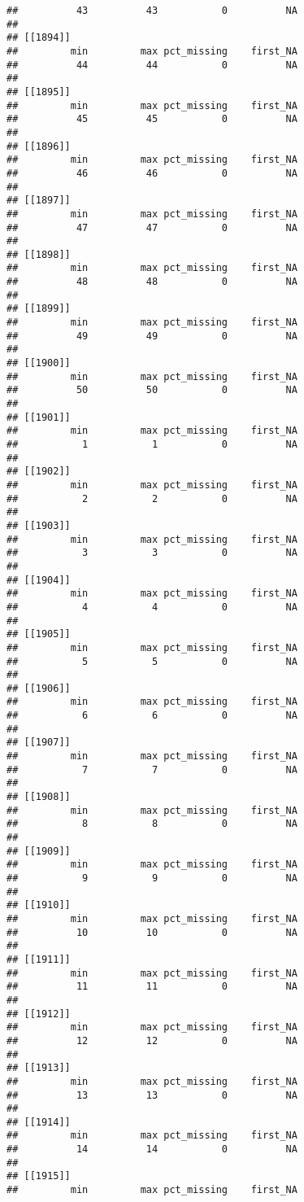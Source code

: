 \documentclass[
]{article}
\begin{document}
\begin{verbatim}
##          43          43           0          NA 
## 
## [[1894]]
##         min         max pct_missing    first_NA 
##          44          44           0          NA 
## 
## [[1895]]
##         min         max pct_missing    first_NA 
##          45          45           0          NA 
## 
## [[1896]]
##         min         max pct_missing    first_NA 
##          46          46           0          NA 
## 
## [[1897]]
##         min         max pct_missing    first_NA 
##          47          47           0          NA 
## 
## [[1898]]
##         min         max pct_missing    first_NA 
##          48          48           0          NA 
## 
## [[1899]]
##         min         max pct_missing    first_NA 
##          49          49           0          NA 
## 
## [[1900]]
##         min         max pct_missing    first_NA 
##          50          50           0          NA 
## 
## [[1901]]
##         min         max pct_missing    first_NA 
##           1           1           0          NA 
## 
## [[1902]]
##         min         max pct_missing    first_NA 
##           2           2           0          NA 
## 
## [[1903]]
##         min         max pct_missing    first_NA 
##           3           3           0          NA 
## 
## [[1904]]
##         min         max pct_missing    first_NA 
##           4           4           0          NA 
## 
## [[1905]]
##         min         max pct_missing    first_NA 
##           5           5           0          NA 
## 
## [[1906]]
##         min         max pct_missing    first_NA 
##           6           6           0          NA 
## 
## [[1907]]
##         min         max pct_missing    first_NA 
##           7           7           0          NA 
## 
## [[1908]]
##         min         max pct_missing    first_NA 
##           8           8           0          NA 
## 
## [[1909]]
##         min         max pct_missing    first_NA 
##           9           9           0          NA 
## 
## [[1910]]
##         min         max pct_missing    first_NA 
##          10          10           0          NA 
## 
## [[1911]]
##         min         max pct_missing    first_NA 
##          11          11           0          NA 
## 
## [[1912]]
##         min         max pct_missing    first_NA 
##          12          12           0          NA 
## 
## [[1913]]
##         min         max pct_missing    first_NA 
##          13          13           0          NA 
## 
## [[1914]]
##         min         max pct_missing    first_NA 
##          14          14           0          NA 
## 
## [[1915]]
##         min         max pct_missing    first_NA 

\end{verbatim}
\end{document}

